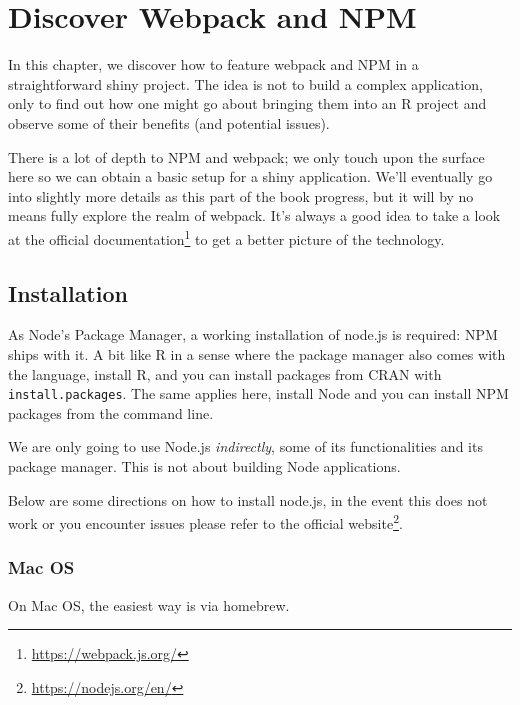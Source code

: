 \documentclass[10pt,]{krantz}
\makeatletter
\renewcommand{\href}[2]{#2\footnote{\url{#1}}}
\newenvironment{kframe}{%
\medskip{}
\setlength{\fboxsep}{.8em}
 \def\at@end@of@kframe{}%
 \ifinner\ifhmode%
  \def\at@end@of@kframe{\end{minipage}}%
  \begin{minipage}{\columnwidth}%
 \fi\fi%
 \def\FrameCommand##1{\hskip\@totalleftmargin \hskip-\fboxsep
 \colorbox{shadecolor}{##1}\hskip-\fboxsep
     \hskip-\linewidth \hskip-\@totalleftmargin \hskip\columnwidth}%
 \MakeFramed {\advance\hsize-\width
   \@totalleftmargin\z@ \linewidth\hsize
   \@setminipage}}%
 {\par\unskip\endMakeFramed%
 \at@end@of@kframe}
\newenvironment{rmdblock}[1]
  {
  \begin{itemize}
  \renewcommand{\labelitemi}{
    \raisebox{-.7\height}[0pt][0pt]{
      {\setkeys{Gin}{width=3em,keepaspectratio}\texttt{[image: images/\#1]}}
    }
  }
  \setlength{\fboxsep}{1em}
  \begin{kframe}
  \item
  }
  {
  \end{kframe}
  \end{itemize}
  }
\newenvironment{rmdnote}
  {\begin{rmdblock}{note}}
  {\end{rmdblock}}
\makeatother
\begin{document}
\hypertarget{webpack-intro-discover}{%
\chapter{Discover Webpack and NPM}\label{webpack-intro-discover}}

In this chapter, we discover how to feature webpack and NPM in a straightforward shiny project. The idea is not to build a complex application, only to find out how one might go about bringing them into an R project and observe some of their benefits (and potential issues).

There is a lot of depth to NPM and webpack; we only touch upon the surface here so we can obtain a basic setup for a shiny application. We'll eventually go into slightly more details as this part of the book progress, but it will by no means fully explore the realm of webpack. It's always a good idea to take a look at the \href{https://webpack.js.org/}{official documentation} to get a better picture of the technology.

\hypertarget{webpack-intro-install}{%
\section{Installation}\label{webpack-intro-install}}

As Node's Package Manager, a working installation of node.js is required: NPM ships with it. A bit like R in a sense where the package manager also comes with the language, install R, and you can install packages from CRAN with \texttt{install.packages}. The same applies here, install Node and you can install NPM packages from the command line.

\begin{rmdnote}
We are only going to use Node.js \emph{indirectly}, some of its
functionalities and its package manager. This is not about building Node
applications.
\end{rmdnote}

Below are some directions on how to install node.js, in the event this does not work or you encounter issues please refer to the \href{https://nodejs.org/en/}{official website}.

\hypertarget{webpack-intro-install-mac}{%
\subsection{Mac OS}\label{webpack-intro-install-mac}}

On Mac OS, the easiest way is via homebrew.
\end{document}
